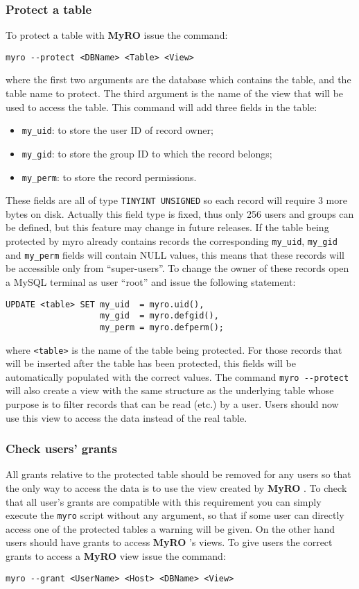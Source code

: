 \documentclass[12pt,titlepage]{article}
\newcommand{\myro}{\textbf{MyRO} }
\begin{document}
\subsubsection{Protect a table}
To protect a table with \myro issue the command:
%
\begin{verbatim}
myro --protect <DBName> <Table> <View>
\end{verbatim}
%
where the first two arguments are the database which contains the
table, and the table name to protect. The third argument is the name
of the view that will be used to access the table. This command will
add three fields in the table:
%
\begin{itemize}
\item \verb|my_uid|: to store the user ID of record owner;
\item \verb|my_gid|: to store the group ID to which the record belongs;
\item \verb|my_perm|: to store the record permissions.
\end{itemize}
%
These fields are all of type \verb|TINYINT UNSIGNED| so each record
will require 3 more bytes on disk. Actually this field type is fixed,
thus only 256 users and groups can be defined, but this feature may
change in future releases. If the table being protected by myro
already contains records the corresponding \verb|my_uid|,
\verb|my_gid| and \verb|my_perm| fields will contain NULL values, this
means that these records will be accessible only from ``super-users''.
To change the owner of these records open a MySQL terminal as user
``root'' and issue the following statement:
%
\begin{verbatim}
UPDATE <table> SET my_uid  = myro.uid(), 
                   my_gid  = myro.defgid(),
                   my_perm = myro.defperm();
\end{verbatim}
%
where \verb|<table>| is the name of the table being protected. For those
records that will be inserted after the table has been protected, this
fields will be automatically populated with the correct values. The
command \verb|myro --protect| will also create a view with the same
structure as the underlying table whose purpose is to filter records
that can be read (etc.) by a user. Users should now use this view to access
the data instead of the real table.

%
\subsubsection{Check users' grants}
\label{sec:myro_Check users' grants}
All grants relative to the protected table should be removed for any
users so that the only way to access the data is to use the view
created by \myro. To check that all user's grants are compatible with
this requirement you can simply execute the \verb|myro| script without
any argument, so that if some user can directly access one of the
protected tables a warning will be given. On the other hand users
should have grants to access \myro's views. To give users the correct
grants to access a \myro view issue the command:
%
\begin{verbatim}
myro --grant <UserName> <Host> <DBName> <View>
\end{verbatim}
%
\end{document}
